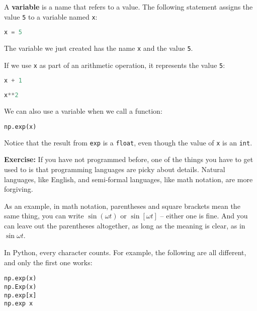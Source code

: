 A \textbf{variable} is a name that refers to a value. The following
statement assigns the value \passthrough{\lstinline!5!} to a variable
named \passthrough{\lstinline!x!}:

\begin{lstlisting}[language=Python,style=source]
x = 5
\end{lstlisting}

The variable we just created has the name \passthrough{\lstinline!x!}
and the value \passthrough{\lstinline!5!}.

If we use \passthrough{\lstinline!x!} as part of an arithmetic
operation, it represents the value \passthrough{\lstinline!5!}:

\begin{lstlisting}[language=Python,style=source]
x + 1
\end{lstlisting}

\begin{lstlisting}[language=Python,style=source]
x**2
\end{lstlisting}

We can also use a variable when we call a function:

\begin{lstlisting}[language=Python,style=source]
np.exp(x)
\end{lstlisting}

Notice that the result from \passthrough{\lstinline!exp!} is a
\passthrough{\lstinline!float!}, even though the value of
\passthrough{\lstinline!x!} is an \passthrough{\lstinline!int!}.

\textbf{Exercise:} If you have not programmed before, one of the things
you have to get used to is that programming languages are picky about
details. Natural languages, like English, and semi-formal languages,
like math notation, are more forgiving.

As an example, in math notation, parentheses and square brackets mean
the same thing, you can write \(\sin (\omega t)\) or \(\sin [\omega t]\)
-- either one is fine. And you can leave out the parentheses altogether,
as long as the meaning is clear, as in \(\sin \omega t\).

In Python, every character counts. For example, the following are all
different, and only the first one works:

\begin{lstlisting}[style=output]
np.exp(x)
np.Exp(x)
np.exp[x]
np.exp x
\end{lstlisting}

